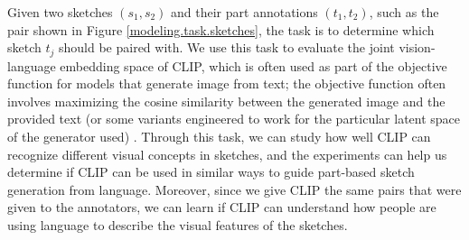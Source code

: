 Given two sketches $(s_1,s_2)$ and their part annotations $(t_1,t_2)$, such as the pair shown in Figure \ref{modeling.task.sketches}, the task is to determine which sketch $t_j$ should be paired with.
We use this task to evaluate the joint vision-language embedding space of CLIP, which is often used as part of the objective function for models that generate image from text; the objective function often involves maximizing the cosine similarity between the generated image and the provided text (or some variants engineered to work for the particular latent space of the generator used) \citep{clipDrawPaper,styleCLIPPaper,styleganNadaPaper,dalle2Paper}. 
Through this task, we can study how well CLIP can recognize different visual concepts in sketches, and the experiments can help us determine if CLIP can be used in similar ways to guide part-based sketch generation from language. Moreover, since we give CLIP the same pairs that were given to the annotators, we can learn if CLIP can understand how people are using language to describe the visual features of the sketches. 